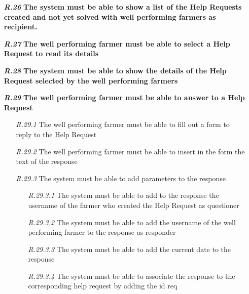 \begin{itemize}
\item [\textbf{\textit{R.26}}] \textbf{The system must be able to show a list of the Help Requests created and not yet solved with well performing farmers as recipient.}
\item [\textbf{\textit{R.27}}] \textbf{The well performing farmer must be able to select a Help Request to read its details}
\item [\textbf{\textit{R.28}}] \textbf{The system must be able to show the details of the Help Request selected by the well performing farmers}
\item [\textbf{\textit{R.29}}] \textbf{The well performing farmer must be able to answer to a Help Request}
        \begin{itemize}
            \item [\textit{R.29.1}] The well performing farmer must be able to fill out a form to reply to the Help Request
            \item [\textit{R.29.2}] The well performing farmer must be able to insert in the form the text of the response
            \item [\textit{R.29.3}] The system must be able to add parameters to the response
            \begin{itemize}
                \item [\textit{R.29.3.1}] The system must be able to add to the response the username of the farmer who created the Help Request as questioner
                \item [\textit{R.29.3.2}] The system must be able to add the username of the well performing farmer to the response as responder
		        \item [\textit{R.29.3.3}] The system must be
		        able to add the current date to the response
		        \item [\textit{R.29.3.4}] The system must be able to associate the response to the corresponding help request by adding the id req
            \end{itemize}
        \end{itemize}



\end{itemize}
